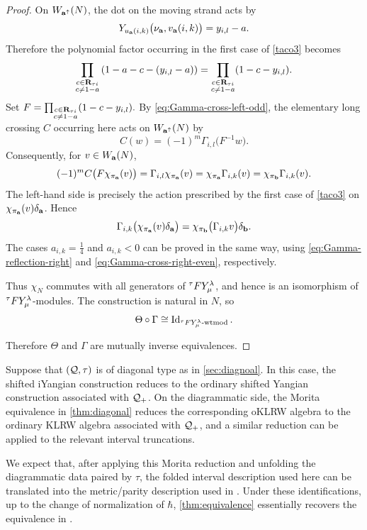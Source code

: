 \begin{proof}
On \(W_{\mathbf{a}^\uparrow}(N)\), the dot on the moving strand acts by
\[
Y_{u_{\mathbf{a}}(i,k)}
\bigl(
\nu_{\mathbf{a}},v_{\mathbf{a}}(i,k)
\bigr)
=
y_{i,l}-a.
\]
Therefore the polynomial factor occurring in the first case of
\cref{taco3} becomes
\[
\prod_{\substack{c\in\mathbf{R}_{\tau i}\\c\neq1-a}}
\left(
1-a-c-(y_{i,l}-a)
\right)
=
\prod_{\substack{c\in\mathbf{R}_{\tau i}\\c\neq1-a}}
(1-c-y_{i,l}).
\]
Set
\(
F
=
\prod_{\substack{c\in\mathbf{R}_{\tau i}\\c\neq1-a}}
(1-c-y_{i,l}).
\)
By \cref{eq:Gamma-cross-left-odd}, the elementary long crossing
\(C\) occurring here acts on \(W_{\mathbf{a}^\uparrow}(N)\) by
\[
C(w)
=
(-1)^m
\Gamma_{i,l}
\bigl(
F^{-1}w
\bigr).
\]
Consequently, for \(v\in W_{\mathbf{a}}(N)\),
\[
\begin{aligned}
(-1)^m
C\bigl(
F\chi_{\pi_{\mathbf{a}}}(v)
\bigr)
=
\Gamma_{i,l}\chi_{\pi_{\mathbf{a}}}(v)
=
\chi_{\pi_{\mathbf{a}}}\Gamma_{i,k}(v)
=
\chi_{\pi_{\mathbf{b}}}\Gamma_{i,k}(v).
\end{aligned}
\]
The left-hand side is precisely the action prescribed by the first
case of \cref{taco3} on
\(\chi_{\pi_{\mathbf{a}}}(v)\delta_{\mathbf{a}}\). Hence
\[
\Gamma_{i,k}
\bigl(
\chi_{\pi_{\mathbf{a}}}(v)\delta_{\mathbf{a}}
\bigr)
=
\chi_{\pi_{\mathbf{b}}}
\bigl(
\Gamma_{i,k}v
\bigr)
\delta_{\mathbf{b}}.
\]
The cases
\(
a_{i,k}=\frac14
\)
and
\(
a_{i,k}<0
\)
can be proved in the same way, using
\cref{eq:Gamma-reflection-right} and
\cref{eq:Gamma-cross-right-even}, respectively. 

Thus \(\chi_N\) commutes with all generators of \({}^\tau F Y_\mu^\lambda\), and hence
is an isomorphism of \({}^\tau F Y_\mu^\lambda\)-modules. The construction is natural
in \(N\), so
\[
   \Theta\circ\Gamma
   \cong
   \operatorname{Id}_{{}^\tau F Y_\mu^\lambda\text{-wtmod}}.
\]

Therefore \(\Theta\) and \(\Gamma\) are mutually inverse
equivalences.
\end{proof}

\begin{remark}
Suppose that \((\mathcal{Q},\tau)\) is of diagonal type as in \cref{sec:diagnoal}. In this case,
the shifted iYangian construction reduces to the ordinary
shifted Yangian construction associated with \(\mathcal{Q}_{+}\). On the
diagrammatic side, the Morita equivalence in
\cref{thm:diagonal} reduces the corresponding oKLRW algebra to the
ordinary KLRW algebra associated with \(\mathcal{Q}_{+}\), and a similar
reduction can be applied to the relevant interval truncations.

We expect that, after applying this Morita reduction and unfolding the diagrammatic data paired by \(\tau\), the folded interval description used here can be translated into the metric/parity description used in \cite{KTWWY19}. Under these identifications, up to the change of normalization of \(\hbar\), \cref{thm:equivalence} essentially recovers the equivalence in \cite[Thm.~5.19]{KTWWY19}. 
\end{remark}


